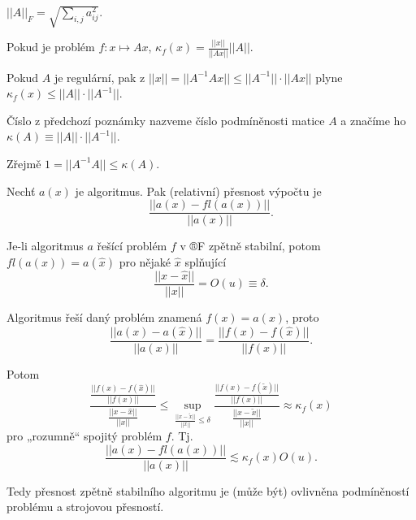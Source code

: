 \documentclass[12pt]{article}					%
\begin{document}
	\begin{definice}
		$||A||_F = \sqrt{\sum_{i, j} a_{ij}^2}$.
	\end{definice}

	\begin{poznamka}[Podmíněnost $Ax$]
		Pokud je problém $f: x \mapsto Ax$, $\kappa_f(x) = \frac{||x||}{||Ax||}||A||$.

		Pokud $A$ je regulární, pak z $||x|| = ||A^{-1}Ax|| ≤ ||A^{-1}||·||Ax||$ plyne $\kappa_f(x) ≤ ||A||·||A^{-1}||$.
	\end{poznamka}

	\begin{definice}
		Číslo z předchozí poznámky nazveme číslo podmíněnosti matice $A$ a značíme ho $\kappa(A) ≡ ||A||·||A^{-1}||$.

		\begin{poznamkain}
			Zřejmě $1 = ||A^{-1}A|| ≤ \kappa(A)$.
		\end{poznamkain}
	\end{definice}

	\begin{definice}
		Nechť $a(x)$ je algoritmus. Pak (relativní) přesnost výpočtu je
		$$ \frac{||a(x) - fl(a(x))||}{||a(x)||}. $$
	\end{definice}

	\begin{poznamka}
		Je-li algoritmus $a$ řešící problém $f$ v ®F zpětně stabilní, potom $fl(a(x)) = a(\hat{x})$ pro nějaké $\hat{x}$ splňující
		$$ \frac{||x - \hat{x}||}{||x||} = O(u) ≡ \delta. $$

		Algoritmus řeší daný problém znamená $f(x) = a(x)$, proto
		$$ \frac{||a(x) - a(\hat{x})||}{||a(x)||} = \frac{||f(x) - f(\hat{x})||}{||f(x)||}. $$

		Potom
		$$ \frac{\frac{||f(x) - f(\hat{x})||}{||f(x)||}}{\frac{||x - \hat{x}||}{||x||}} ≤ \sup_{\frac{||x - \tilde x||}{||x||} ≤ \delta} \frac{\frac{||f(x) - f(\tilde{x})||}{||f(x)||}}{\frac{||x - \tilde{x}||}{||x||}} \approx \kappa_f(x) $$
		pro „rozumně“ spojitý problém $f$. Tj.
		$$ \frac{||a(x) - fl(a(x))||}{||a(x)||} \lesssim \kappa_f(x) O(u). $$

		Tedy přesnost zpětně stabilního algoritmu je (může být) ovlivněna podmíněností problému a strojovou přesností.
	\end{poznamka}
\end{document}
